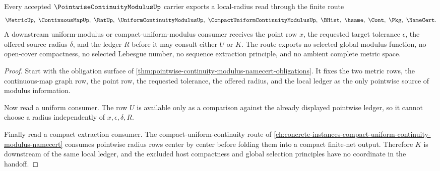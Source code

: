 \begin{theorem}
\label{thm:pointwise-continuity-modulus-uniform-extraction-handoff}
Every accepted $\PointwiseContinuityModulusUp$ carrier exports a local-radius read through the finite route
$$
\MetricUp,\ \ContinuousMapUp,\ \RatUp,\ \UniformContinuityModulusUp,\ \CompactUniformContinuityModulusUp,\ \BHist,\ \hsame,\ \Cont,\ \Pkg,\ \NameCert .
$$
A downstream uniform-modulus or compact-uniform-modulus consumer receives the point row $x$, the requested target tolerance $\epsilon$, the offered source radius $\delta$, and the ledger $R$ before it may consult either $U$ or $K$. The route exports no selected global modulus function, no open-cover compactness, no selected Lebesgue number, no sequence extraction principle, and no ambient complete metric space.
\end{theorem}
\begin{proof}
Start with the obligation surface of \autoref{thm:pointwise-continuity-modulus-namecert-obligations}. It fixes the two metric rows, the continuous-map graph row, the point row, the requested tolerance, the offered radius, and the local ledger as the only pointwise source of modulus information.

Now read a uniform consumer. The row $U$ is available only as a comparison against the already displayed pointwise ledger, so it cannot choose a radius independently of $x,\epsilon,\delta,R$.

Finally read a compact extraction consumer. The compact-uniform-continuity route of \autoref{ch:concrete-instances-compact-uniform-continuity-modulus-namecert} consumes pointwise radius rows center by center before folding them into a compact finite-net output. Therefore $K$ is downstream of the same local ledger, and the excluded host compactness and global selection principles have no coordinate in the handoff.
\end{proof}


